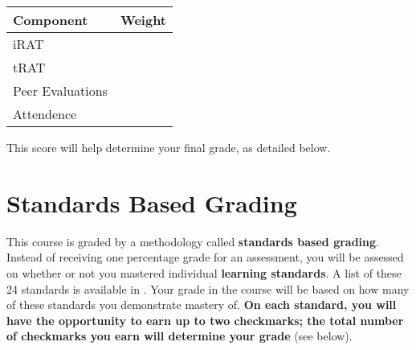 \documentclass{article}
\begin{document}
\begin{itemize}
    \begin{center}
    \begin{tabular}{l|l}
    Component & Weight \\ \hline \hline
    iRAT &   \\ \hline
    tRAT &  \\ \hline
    Peer Evaluations &  \\ \hline
    Attendence &  \\ \hline
    \end{tabular}
    \end{center}

    This score will help determine your final grade, as detailed below.
    \end{itemize}


\section*{\fontsize{12}{15}\selectfont Standards Based Grading}
This course is graded by a methodology called {\bf standards based grading}.  Instead of receiving one percentage grade for an assessment, you will be assessed on whether or not you mastered individual {\bf learning standards}.  A list of these 24 standards is available in \LMS.  Your grade in the course will be based on how many of these standards you demonstrate mastery of.  {\bf On each standard, you will have the opportunity to earn up to two checkmarks; the total number of checkmarks you earn will determine your grade} (see below).
\end{document}
